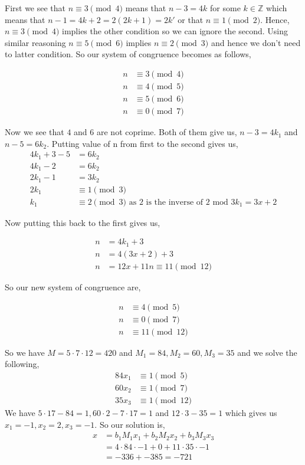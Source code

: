\documentclass[12pt]{exam}
\begin{document}
\begin{questions}
First we see that $n \equiv 3 \pmod 4$ means that  $n - 3 = 4k$ for some  $k \in \mathbb{Z}$ which means that  $n - 1 = 4k + 2 = 2(2k + 1) = 2k'$ or that  $n \equiv 1 \pmod 2$.  Hence,  $n \equiv 3 \pmod 4$ implies the other condition so we can ignore the second. Using similar reasoning $n \equiv 5 \pmod 6$ implies  $n \equiv 2 \pmod 3$ and hence we don't need to latter condition. So our system of congruence becomes as follows, 

\begin{align*}
    n &\equiv 3 \pmod 4\\
    n &\equiv 4 \pmod 5\\
    n &\equiv 5 \pmod 6\\
    n &\equiv 0 \pmod 7
\end{align*}


Now we see that $4$ and $6$ are not coprime. Both of them give us, $n - 3 =4k_1$ and $n - 5 = 6k_2$. Putting value of n from first to the second gives us, 
\begin{align*}
    4k_1 + 3 - 5 &= 6k_2\\
    4k_1 -2 &= 6k_2\\
    2k_1 -1 &= 3k_2\\
    2k_1 & \equiv 1 \pmod 3\\
    k_1 & \equiv 2 \pmod 3 \text{ as $2$ is the inverse of $2$ mod $3$}
    k_1 = 3x + 2
\end{align*}

Now putting this back to the first gives us, 

\begin{align*}
    n  &= 4k_1 + 3\\
    n &= 4(3x + 2) + 3\\
    n &= 12x + 11
    n \equiv 11 \pmod {12}
\end{align*}


So our new system of congruence are,

\begin{align*}
    n &\equiv 4 \pmod 5\\
    n &\equiv 0 \pmod 7\\
    n & \equiv 11 \pmod {12}
\end{align*}

So we have $M = 5 \cdot 7 \cdot 12 = 420$ and  $M_1 = 84, M_2 = 60, M_3 = 35$ and we solve the following, 
\begin{align*}
    84 x_1 &\equiv 1 \pmod 5\\
    60 x_2 &\equiv 1 \pmod 7\\
    35 x_3 &\equiv 1 \pmod {12}
\end{align*}
We have $5 \cdot 17 - 84 = 1, 60 \cdot 2 - 7 \cdot 17 = 1$ and  $12 \cdot 3 - 35 = 1$ which gives us $x_1 = -1, x_2 = 2, x_3 = -1$. So our solution is, 
\begin{align*}
    x &= b_1M_1x_1 + b_2M_2x_2 + b_3M_3x_3 \\
        &= 4 \cdot 84 \cdot -1 + 0 + 11 \cdot 35 \cdot -1 \\
        &=  -336 + -385 = -721
\end{align*}


\end{questions}
\end{document}
